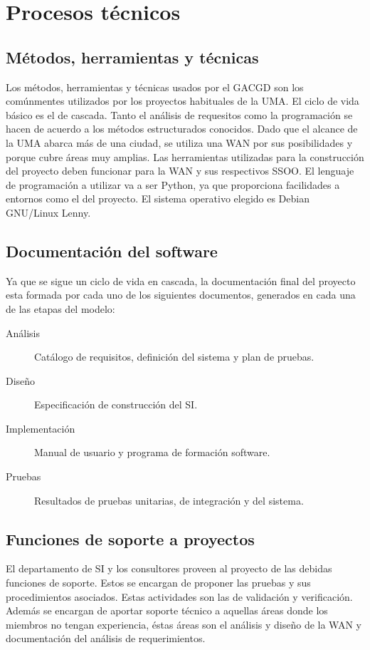 \documentclass[11pt,a4paper,spanish,twoside]{report}
\begin{document}
\chapter{Procesos técnicos}
\section{Métodos, herramientas y técnicas}
Los métodos, herramientas y técnicas usados por el GACGD son los comúnmentes 
utilizados por los proyectos habituales de la UMA. El ciclo de vida básico es 
el de cascada. Tanto el análisis de requesitos como la programación se hacen 
de acuerdo a los métodos estructurados conocidos. Dado que el alcance de la 
UMA abarca más de una ciudad, se utiliza una WAN por sus posibilidades y 
porque cubre áreas muy amplias. Las herramientas utilizadas para la 
construcción del proyecto deben funcionar para la WAN y sus respectivos SSOO. 
El lenguaje de programación a utilizar va a ser Python, ya que proporciona 
facilidades a entornos como el del proyecto. El sistema operativo elegido es 
Debian GNU/Linux Lenny.

\section{Documentación del software}
Ya que se sigue un ciclo de vida en cascada, la documentación final del 
proyecto esta formada por cada uno de los siguientes documentos, generados en 
cada una de las etapas del modelo:

\begin{description}
\item[Análisis] Catálogo de requisitos, definición del sistema y plan de
  pruebas.  
\item[Diseño] Especificación de construcción del SI.
\item[Implementación] Manual de usuario y programa de formación software. 
\item[Pruebas] Resultados de pruebas unitarias, de integración y del sistema.
\end{description}

\section{Funciones de soporte a proyectos}
El departamento de SI y los consultores proveen al proyecto de las debidas 
funciones de soporte. Estos se encargan de proponer las pruebas y sus 
procedimientos asociados. Estas actividades son las de validación y 
verificación. Además se encargan de aportar soporte técnico a aquellas áreas 
donde los miembros no tengan experiencia, éstas áreas son el análisis y diseño 
de la WAN y documentación del análisis de requerimientos.
\end{document}
